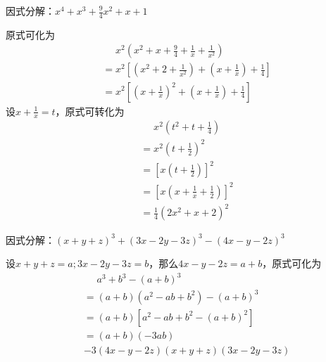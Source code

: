 \documentclass[windows,csize4]{BHCexam}
\begin{document}
\begin{groups}
\begin{questions}[]
        \question[5] 因式分解：$x^4+x^3+\frac{9}{4} x^2+x+1$
        \begin{solution}{0.5cm}
            \methodonly 原式可化为
            \[
                \begin{aligned}
                     & \phantom{=}x^2\left(x^2+x+\frac{9}{4}+\frac{1}{x}+\frac{1}{x^2}\right) \\
                     & = x^2\left[\left(x^2+2+\frac{1}{x^2}\right)+
                        \left(x+\frac{1}{x}\right)+\frac{1}{4}\right]                         \\
                     & = x^2\left[\left(x+\frac{1}{x}\right)^2+
                        \left(x+\frac{1}{x}\right)+\frac{1}{4}\right]
                \end{aligned}
            \]
            设$x+\frac{1}{x}=t$，原式可转化为
            \[
                \begin{aligned}
                     & \phantom{=}x^2\left(t^2+t+\frac{1}{4}\right)              \\
                     & = x^2 \left(t+\frac{1}{2}\right)^2                        \\
                     & = \left[x \left(t+\frac{1}{2}\right)\right]^2             \\
                     & = \left[x \left(x+\frac{1}{x}+\frac{1}{2}\right)\right]^2 \\
                     & = \frac{1}{4}(2x^2+x+2)^2
                \end{aligned}
            \]
        \end{solution}
        \vspace{3.5cm}

        \question[5] 因式分解：$(x+y+z)^3+(3x-2y-3z)^3-(4x-y-2z)^3$
        \begin{solution}{0.5cm}
            \methodonly 设$x+y+z=a;3x-2y-3z=b$，那么$4x-y-2z=a+b$，原式可化为
            \[
                \begin{aligned}
                     & \phantom{=}a^3+b^3-(a+b)^3 \\
                     & = (a+b)(a^2-ab+b^2)-(a+b)^3 \\ 
                     & = (a+b)[a^2-ab+b^2-(a+b)^2] \\ 
                     & = (a+b)(-3ab) \\ 
                     &-3(4x-y-2z)(x+y+z)(3x-2y-3z)
                \end{aligned}
            \]
        \end{solution}
        \vspace{3.5cm}

    \end{questions}
\end{groups}

\label{lastpage}
\end{document}

